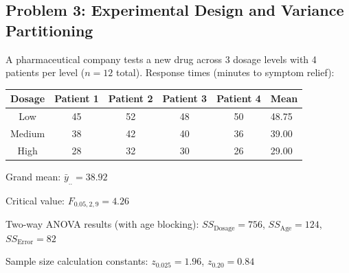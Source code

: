\documentclass[12pt]{article}
\begin{document}
\subsection*{Problem 3: Experimental Design and Variance Partitioning}

A pharmaceutical company tests a new drug across 3 dosage levels with 4 patients per level ($n=12$ total). Response times (minutes to symptom relief):

\begin{center}
\begin{tabular}{ccccc}
\toprule
Dosage & Patient 1 & Patient 2 & Patient 3 & Patient 4 & Mean \\
\midrule
Low & 45 & 52 & 48 & 50 & 48.75 \\
Medium & 38 & 42 & 40 & 36 & 39.00 \\
High & 28 & 32 & 30 & 26 & 29.00 \\
\bottomrule
\end{tabular}
\end{center}

Grand mean: $\bar{y}_{..} = 38.92$

Critical value: $F_{0.05,2,9} = 4.26$

Two-way ANOVA results (with age blocking): $SS_{\text{Dosage}} = 756$, $SS_{\text{Age}} = 124$, $SS_{\text{Error}} = 82$

Sample size calculation constants: $z_{0.025} = 1.96$, $z_{0.20} = 0.84$
\end{document}
